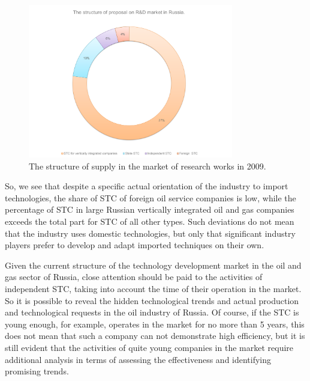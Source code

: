 \documentclass[12pt]{report}
\theoremstyle{definition}
\begin{document}
\begin{figure}[ht]
	\centering     
	\includegraphics[width=0.8\textwidth]{intro_fig_1_eng}   
	\caption{The structure of supply in the market of research works in 2009.}  
	\label{fig:int1} 
\end{figure} 

So, we see that despite a specific actual orientation of the industry to import technologies, the share of STC of foreign oil service companies is low, while the percentage of STC in large Russian vertically integrated oil and gas companies exceeds the total part for STC of all other types.
Such deviations do not mean that the industry uses domestic technologies, but only that significant industry players prefer to develop and adapt imported techniques on their own.

Given the current structure of the technology development market in the oil and gas sector of Russia, close attention should be paid to the activities of independent STC, taking into account the time of their operation in the market.
So it is possible to reveal the hidden technological trends and actual production and technological requests in the oil industry of Russia.
Of course, if the STC is young enough, for example, operates in the market for no more than 5 years, this does not mean that such a company can not demonstrate high efficiency, but it is still evident that the activities of quite young companies in the market require additional analysis in terms of assessing the effectiveness and identifying promising trends.

\end{document}
